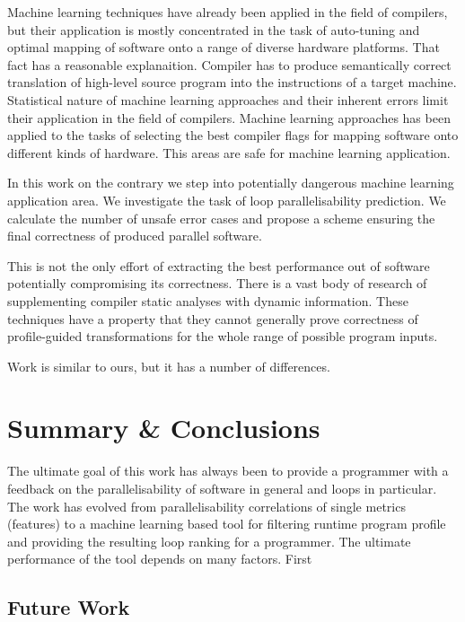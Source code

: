 \documentclass[sigconf,10pt,review,anonymous]{acmart}
\begin{document}
Machine learning techniques have already been applied in the field of compilers, but their application is mostly concentrated in the task of auto-tuning and optimal mapping of software onto a range of diverse hardware platforms. That fact has a reasonable explanaition. Compiler has to produce semantically correct translation of high-level source program into the instructions of a target machine. Statistical nature of machine learning approaches and their inherent errors limit their application in the field of compilers. Machine learning approaches has been applied to the tasks of selecting the best compiler flags for mapping software onto different kinds of hardware. This areas are safe for machine learning application. 

In this work on the contrary we step into potentially dangerous machine learning application area. We investigate the task of loop parallelisability prediction. We calculate the number of unsafe error cases and propose a scheme ensuring the final correctness of produced parallel software.

This is not the only effort of extracting the best performance out of software potentially compromising its correctness. There is a vast body of research of supplementing compiler static analyses with dynamic information. These techniques have a property that they cannot generally prove correctness of profile-guided transformations for the whole range of possible program inputs.

Work \cite{fried_ea:2013:icmla} is similar to ours, but it has a number of differences.  



\section{Summary \& Conclusions}

The ultimate goal of this work has always been to provide a programmer with a feedback on the parallelisability of software in general and loops in particular. The work has evolved from parallelisability correlations of single metrics (features) to a machine learning based tool for filtering runtime program profile and providing the resulting loop ranking for a programmer.\newline\null
\quad The ultimate performance of the tool depends on many factors. First 

\subsection{Future Work}
\end{document}
